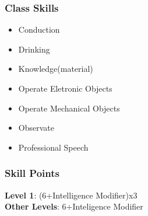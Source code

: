 \documentclass[ letterpaper,12pt]{article}
\begin{document}
\subsubsection{Class Skills}
\begin{itemize}
\item{Conduction}
\item{Drinking}
\item{Knowledge(material)}
\item{Operate Eletronic Objects}
\item{Operate Mechanical Objects}
\item{Observate}
\item{Professional Speech}
\end{itemize}

\subsubsection{Skill Points}
{\bf Level 1}: (6+Intelligence Modifier)x3\\
{\bf Other Levels}: 6+Inteligence Modifier\\
\end{document}
